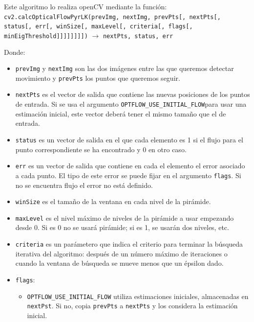 \documentclass[a4paper,openright, 12pt]{book}
\begin{document}
Este algoritmo lo realiza openCV mediante la función: \newline
\lstinline|cv2.calcOpticalFlowPyrLK(prevImg, nextImg, prevPts[, nextPts[, status[, err[, winSize[, maxLevel[, criteria[, flags[, minEigThreshold]]]]]]]])|
$\rightarrow$  \lstinline|nextPts, status, err|
\newline

Donde:
\begin{itemize}
\item \lstinline|prevImg| y \lstinline|nextImg| son las dos imágenes entre las que queremos detectar movimiento y \lstinline|prevPts| los puntos que queremos seguir.
\item \lstinline|nextPts| es el vector de salida que contiene las nuevas posiciones de los puntos de entrada. Si se usa el argumento \lstinline|OPTFLOW_USE_INITIAL_FLOW|para usar una estimación inicial, este vector deberá tener el mismo tamaño que el de entrada.

\item \lstinline|status| es un vector de salida en el que cada elemento es 1 si el flujo para el punto correspondiente se ha encontrado y 0 en otro caso.

\item \lstinline|err| es un vector de salida que contiene en cada el elemento el error asociado a cada punto. El tipo de este error se puede fijar en el argumento \lstinline|flags|.  Si no se encuentra flujo el error no está definido.

\item \lstinline|winSize| es el tamaño de la ventana en cada nivel de la pirámide.


\item \lstinline|maxLevel| es el nivel máximo de niveles  de la pirámide a usar empezando desde 0. Si es 0 no se usará pirámide; si es 1, se usarán dos niveles, etc. 

\item \lstinline|criteria| es un parámetero que indica el criterio para terminar la búsqueda iterativa del algoritmo: después de un número máximo de iteraciones
o cuando la ventana de búsqueda se mueve menos que un épsilon dado.
\newpage
\item \lstinline|flags|:
	\begin{itemize}
    \item \lstinline|OPTFLOW_USE_INITIAL_FLOW| utiliza estimaciones iniciales, almacenadas en \lstinline|nextPst|. Si no, copia \lstinline|prevPts| a \lstinline|nextPts| y los considera la estimación inicial.
    

\end{itemize}
\end{itemize}
\end{document}
